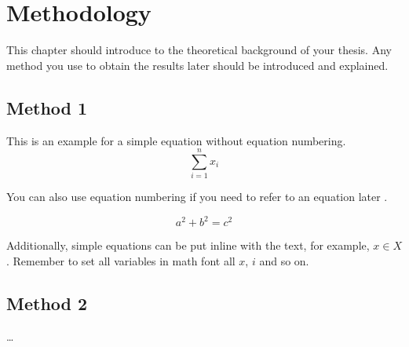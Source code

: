 \chapter{Methodology}
\label{ch:methods}

This chapter should introduce to the theoretical background of your thesis. Any method you use to obtain the results later should be introduced and explained. 

\section{Method 1}

This is an example for a simple equation without equation numbering.
$$
\sum\limits_{i=1}^{n}{x_i}
$$

You can also use equation numbering if you need to refer to an equation later \eg {}.


\begin{equation}
a^2 + b^2 = c^2
\label{eq:ex1}
\end{equation}

Additionally, simple equations can be put inline with the text, for example, $x \in X$. Remember to set all variables in math font \ie all $x$, $i$ and so on.

\section{Method 2}

\dots

